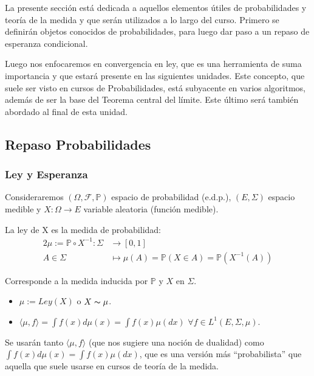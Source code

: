 La presente sección está dedicada a aquellos elementos útiles de probabilidades y teoría de la medida y que serán utilizados a lo largo del curso. Primero se definirán objetos conocidos de probabilidades, para luego dar paso a un repaso de esperanza condicional.

\newp Luego nos enfocaremos en convergencia en ley, que es una herramienta de suma importancia y que estará presente en las siguientes unidades. Este concepto, que suele ser visto en cursos de Probabilidades, está subyacente en varios algoritmos, además de ser la base del Teorema central del límite. Este último será también abordado al final de esta unidad.

\subsection{Repaso Probabilidades}
\subsubsection{Ley y Esperanza}

Consideraremos $(\Omega,\mathcal{F},\mathbb{P})$ espacio de probabilidad (e.d.p.), $(E,\Sigma)$ espacio medible y $X: \Omega \longrightarrow E$ variable aleatoria (función medible).

\begin{definition}[Ley de X]
La ley de X es la medida de probabilidad:
\begin{alignat*}{2}
    \mu := \mathbb{P} \circ X^{-1}:  \Sigma &\longrightarrow [0,1] \\
    A \in \Sigma & \longmapsto \mu(A)=\mathbb{P}(X \in A)=\mathbb{P}(X^{-1}(A))
\end{alignat*}

Corresponde a la medida inducida por $\mathbb{P}$ y $X$ en $\Sigma$.
\end{definition}

\begin{notation}
\beforeitemize
\begin{itemize}
    \item $\mu:=Ley(X)$ o $X\thicksim \mu$.
    \item $\displaystyle \langle \mu, f \rangle = \int f(x) d\mu(x) = \int f(x)\mu(dx)$ \espacio $\forall f \in L^1(E,\Sigma,\mu)$.
\end{itemize}
Se usarán tanto $\langle \mu, f \rangle$ (que nos sugiere una noción de dualidad) como $\int f(x) d\mu(x) = \int f(x)\mu(dx)$, que es una versión más ``probabilista'' que aquella que suele usarse en cursos de teoría de la medida.
\end{notation}


